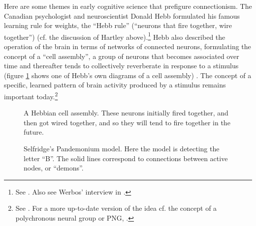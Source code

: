 Here are some themes in early cognitive science that prefigure connectionism. The Canadian psychologist and neuroscientist Donald Hebb formulated his famous learning rule for weights, the ``Hebb rule'' (``neurons that fire together, wire together'') \cite{hebb2005organization} (cf. the discussion of Hartley above).\footnote{See . Also see Werbos' interview in  \cite{anderson2000talking}.}  Hebb also described the operation of the brain in terms of networks of connected neurons, formulating the concept of a ``cell assembly'', a group of neurons that becomes associated over time and thereafter tends to collectively reverberate in response to a stimulus (figure \ref{hebb} shows one of Hebb's own diagrams of a cell assembly) \cite{hebb2005organization}. The concept of a specific, learned pattern of brain activity produced by a stimulus remains important today.\footnote{See . For a more up-to-date version of the idea cf. the concept of a polychronous neural group or PNG, .}

\begin{figure}[h]
\centering
{}
\caption[From Hebb, 2005 \cite{hebb2005organization}]{A Hebbian cell assembly. These neurons initially fired together, and then got wired together, and so they will tend to fire together in the future.}
\label{hebb}
\end{figure}

\begin{figure}[h]
\centering
{}
\caption[From Groome, 2013 \cite{groome2013introduction}]{Selfridge's Pandemonium model. Here the model is detecting the letter ``B''. The solid lines correspond to connections between active nodes, or ``demons''.}
\label{selfridge}
\end{figure}

